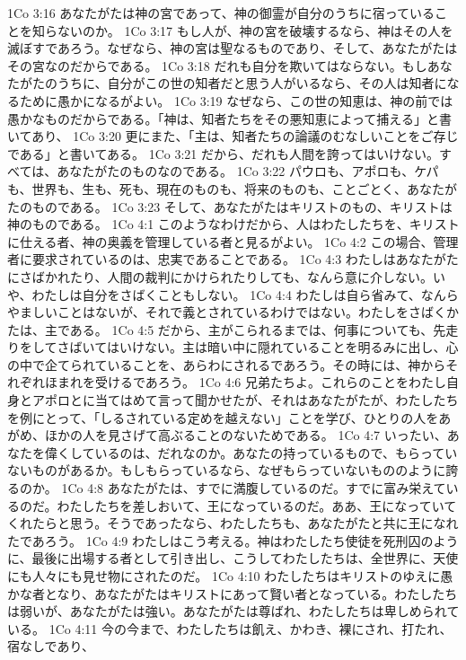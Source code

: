 1Co 3:16  あなたがたは神の宮であって、神の御霊が自分のうちに宿っていることを知らないのか。
1Co 3:17  もし人が、神の宮を破壊するなら、神はその人を滅ぼすであろう。なぜなら、神の宮は聖なるものであり、そして、あなたがたはその宮なのだからである。
1Co 3:18  だれも自分を欺いてはならない。もしあなたがたのうちに、自分がこの世の知者だと思う人がいるなら、その人は知者になるために愚かになるがよい。
1Co 3:19  なぜなら、この世の知恵は、神の前では愚かなものだからである。「神は、知者たちをその悪知恵によって捕える」と書いてあり、
1Co 3:20  更にまた、「主は、知者たちの論議のむなしいことをご存じである」と書いてある。
1Co 3:21  だから、だれも人間を誇ってはいけない。すべては、あなたがたのものなのである。
1Co 3:22  パウロも、アポロも、ケパも、世界も、生も、死も、現在のものも、将来のものも、ことごとく、あなたがたのものである。
1Co 3:23  そして、あなたがたはキリストのもの、キリストは神のものである。
1Co 4:1  このようなわけだから、人はわたしたちを、キリストに仕える者、神の奥義を管理している者と見るがよい。
1Co 4:2  この場合、管理者に要求されているのは、忠実であることである。
1Co 4:3  わたしはあなたがたにさばかれたり、人間の裁判にかけられたりしても、なんら意に介しない。いや、わたしは自分をさばくこともしない。
1Co 4:4  わたしは自ら省みて、なんらやましいことはないが、それで義とされているわけではない。わたしをさばくかたは、主である。
1Co 4:5  だから、主がこられるまでは、何事についても、先走りをしてさばいてはいけない。主は暗い中に隠れていることを明るみに出し、心の中で企てられていることを、あらわにされるであろう。その時には、神からそれぞれほまれを受けるであろう。
1Co 4:6  兄弟たちよ。これらのことをわたし自身とアポロとに当てはめて言って聞かせたが、それはあなたがたが、わたしたちを例にとって、「しるされている定めを越えない」ことを学び、ひとりの人をあがめ、ほかの人を見さげて高ぶることのないためである。
1Co 4:7  いったい、あなたを偉くしているのは、だれなのか。あなたの持っているもので、もらっていないものがあるか。もしもらっているなら、なぜもらっていないもののように誇るのか。
1Co 4:8  あなたがたは、すでに満腹しているのだ。すでに富み栄えているのだ。わたしたちを差しおいて、王になっているのだ。ああ、王になっていてくれたらと思う。そうであったなら、わたしたちも、あなたがたと共に王になれたであろう。
1Co 4:9  わたしはこう考える。神はわたしたち使徒を死刑囚のように、最後に出場する者として引き出し、こうしてわたしたちは、全世界に、天使にも人々にも見せ物にされたのだ。
1Co 4:10  わたしたちはキリストのゆえに愚かな者となり、あなたがたはキリストにあって賢い者となっている。わたしたちは弱いが、あなたがたは強い。あなたがたは尊ばれ、わたしたちは卑しめられている。
1Co 4:11  今の今まで、わたしたちは飢え、かわき、裸にされ、打たれ、宿なしであり、
